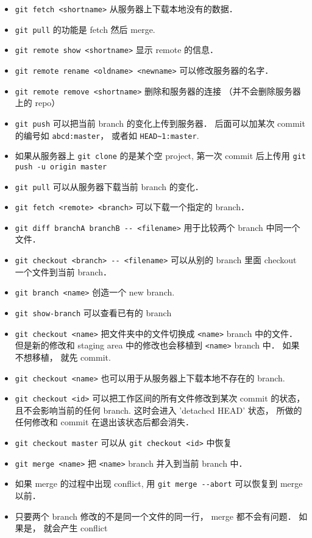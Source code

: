 \begin{itemize}
\item \verb|git fetch <shortname>| 从服务器上下载本地没有的数据．
\item \verb|git pull| 的功能是 fetch 然后 merge.
\item \verb|git remote show <shortname>| 显示 remote 的信息．
\item \verb|git remote rename <oldname> <newname>| 可以修改服务器的名字．
\item \verb|git remote remove <shortname>| 删除和服务器的连接 （并不会删除服务器上的 repo）
\item \verb|git push| 可以把当前 branch 的变化上传到服务器． 后面可以加某次 commit 的编号如 \verb|abcd:master|， 或者如 \verb|HEAD~1:master|.
\item 如果从服务器上 \verb|git clone| 的是某个空 project, 第一次 commit 后上传用 \verb|git push -u origin master|
\item \verb|git pull| 可以从服务器下载当前 branch 的变化．
\item \verb|git fetch <remote> <branch>| 可以下载一个指定的 branch．
\item \verb|git diff branchA branchB -- <filename>| 用于比较两个 branch 中同一个文件．
\item \verb|git checkout <branch> -- <filename>| 可以从别的 branch 里面 checkout 一个文件到当前 branch．
\item \verb|git branch <name>| 创造一个 new branch.
\item \verb|git show-branch| 可以查看已有的 branch 
\item \verb|git checkout <name>| 把文件夹中的文件切换成 \verb|<name>| branch 中的文件． 但是新的修改和 staging area 中的修改也会移植到 \verb|<name>| branch 中． 如果不想移植， 就先 commit.
\item \verb|git checkout <name>| 也可以用于从服务器上下载本地不存在的 branch.
\item \verb|git checkout <id>| 可以把工作区间的所有文件修改到某次 commit 的状态， 且不会影响当前的任何 branch. 这时会进入 'detached HEAD' 状态， 所做的任何修改和 commit 在退出该状态后都会消失．
\item \verb|git checkout master| 可以从 \verb|git checkout <id>| 中恢复
\item \verb|git merge <name>| 把 \verb|<name>| branch 并入到当前 branch 中．
\item 如果 merge 的过程中出现 conflict, 用 \verb|git merge --abort| 可以恢复到 merge 以前．
\item 只要两个 branch 修改的不是同一个文件的同一行， merge 都不会有问题． 如果是， 就会产生 conflict

\end{itemize}
